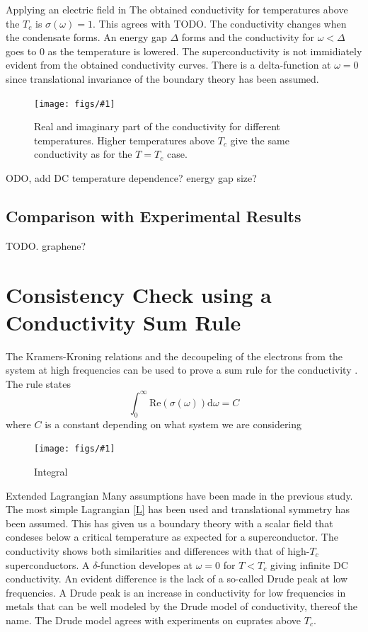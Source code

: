 \documentclass[12pt]{report}
\renewcommand{\d}{\ensuremath{\mathrm{d}}}
\newcommand{\re}{\ensuremath{\mathrm{Re}}}
\newcommand{\fig}[3]{
\begin{figure}
\centering
\texttt{[image: figs/\#1]}
\caption{#2}
\end{figure}
}
\begin{document}
Applying an electric field in 
The obtained conductivity for temperatures above the $T_c$ is $\sigma(\omega)=1$. This agrees with TODO. The conductivity changes when the condensate forms. An energy gap $\Delta$ forms and the conductivity for $\omega<\Delta$ goes to 0 as the temperature is lowered. The superconductivity is not immidiately evident from the obtained conductivity curves. There is a delta-function at $\omega=0$ since translational invariance of the boundary theory has been assumed.
\fig{cond_Ts}{Real and imaginary part of the conductivity for different temperatures. Higher temperatures above $T_c$ give the same conductivity as for the $T=T_c$ case. \label{cond_Ts}}
TODO, add DC temperature dependence? energy gap size?
\subsection{Comparison with Experimental Results}
TODO. graphene?
\section{Consistency Check using a Conductivity Sum Rule}
The Kramers-Kroning relations and the decoupeling of the electrons from the system at high frequencies can be used to prove a sum rule for the conductivity \cite{PhysRev.109.1398}. The rule states
\begin{equation}
 \int_0^\infty\re(\sigma(\omega))\d\omega=C
\end{equation}
where $C$ is a constant depending on what system we are considering 
\fig{sum_rule_a20}{Integral}


\chapter{Extended Lagrangian\label{higherOrder}}
Many assumptions have been made in the previous study. The most simple Lagrangian \eqref{L} has been used and translational symmetry has been assumed. This has given us a boundary theory with a scalar field that condeses below a critical temperature as expected for a superconductor. The conductivity shows both similarities and differences with that of high-$T_c$ superconductors. A $\delta$-function developes at $\omega=0$ for $T<T_c$ giving infinite DC conductivity. An evident difference is the lack of a so-called Drude peak at low frequencies. A Drude peak is an increase in conductivity for low frequencies in metals that can be well modeled by the Drude model of conductivity\cite{drude}, thereof the name. The Drude model agrees with experiments on cuprates above $T_c$\cite{drudeFit}.
\end{document}

